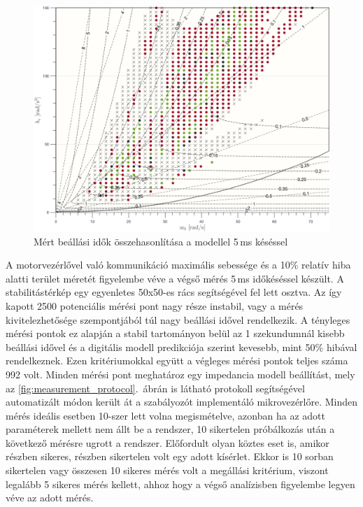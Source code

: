 \begin{figure}[b!]
	\begin{center}
		\includegraphics[width=\textwidth]{images/experiment_comparison_0005.png}
		\caption{Mért beállási idők összehasonlítása a modellel 5\,ms késéssel}\label{fig:experiment_comparison_0005}
	\end{center}
\end{figure}

A motorvezérlővel való kommunikáció maximális sebessége és a 10\% relatív hiba alatti terület méretét figyelembe véve 
a végső mérés 5\,ms időkéséssel készült. A stabilitástérkép egy egyenletes 50x50-es rács segítségével fel lett 
osztva. Az így kapott 2500 potenciális mérési pont nagy része instabil, vagy a mérés kivitelezhetősége szempontjából 
túl nagy beállási idővel rendelkezik. A tényleges mérési pontok ez alapján a stabil tartományon belül az 1 szekundumnál 
kisebb beállási idővel és a digitális modell predikciója szerint kevesebb, mint 50\% hibával rendelkeznek. Ezen kritériumokkal 
együtt a végleges mérési pontok teljes száma 992 volt. Minden mérési pont meghatároz egy impedancia modell beállítást, mely 
az \ref{fig:measurement_protocol}.~ábrán is látható protokoll segítségével automatizált módon került át a szabályozót 
implementáló mikrovezérlőre. Minden mérés ideális esetben 10-szer lett volna megismételve, azonban ha az adott paraméterek mellett 
nem állt be a rendszer, 10 sikertelen próbálkozás után a következő mérésre ugrott a rendszer. Előfordult olyan köztes eset is, 
amikor részben sikeres, részben sikertelen volt egy adott kísérlet. Ekkor is 10 sorban sikertelen vagy összesen 10 sikeres 
mérés volt a megállási kritérium, viszont legalább 5 sikeres mérés kellett, ahhoz hogy a végső analízisben figyelembe legyen 
véve az adott mérés.



